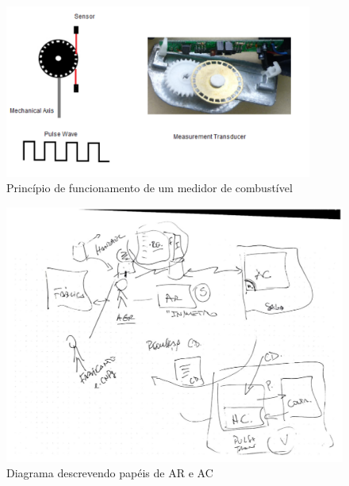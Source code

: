 \documentclass[12pt]{article}
\begin{document}
\begin{figure}[ht]
\centering
\includegraphics[width=0.9\textwidth]{transducer}
\caption{Princípio de funcionamento de um medidor de combustível}
\label{f:transducer}
\end{figure}



\begin{figure}[ht]
\centering
\includegraphics[width=1\textwidth]{ruy.pdf}
\caption{Diagrama descrevendo papéis de AR e AC}
\label{f:ruy}
\end{figure}

\end{document}
